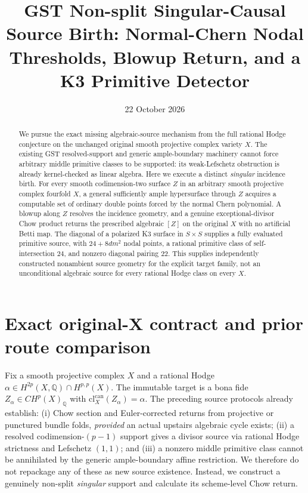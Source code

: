 \documentclass[11pt]{article}
\title{GST Non-split Singular-Causal Source Birth:
Normal-Chern Nodal Thresholds, Blowup Return, and a K3 Primitive Detector}
\date{22 October 2026}
\begin{document}
\maketitle
\begin{abstract}
We pursue the exact missing algebraic-source mechanism from the full
rational Hodge conjecture on the unchanged original smooth projective
complex variety $X$. The existing GST resolved-support and generic
ample-boundary machinery cannot force arbitrary middle primitive classes
to be supported: its weak-Lefschetz obstruction is already kernel-checked
as linear algebra. Here we execute a distinct \emph{singular} incidence
birth. For every smooth codimension-two surface $Z$ in an arbitrary
smooth projective complex fourfold $X$, a general sufficiently ample
hypersurface through $Z$ acquires a computable set of ordinary double
points forced by the normal Chern polynomial. A blowup along $Z$
resolves the incidence geometry, and a genuine exceptional-divisor
Chow product returns the prescribed algebraic $[Z]$ on the original
$X$ with no artificial Betti map. The diagonal of a polarized K3
surface in $S\times S$ supplies a fully evaluated primitive source,
with $24+8dm^2$ nodal points, a rational primitive class of
self-intersection $24$, and nonzero diagonal pairing $22$.
This supplies independently constructed nonambient source geometry
for the explicit target family, not an unconditional algebraic source
for every rational Hodge class on every $X$.
\end{abstract}

\section{Exact original-X contract and prior route comparison}
Fix a smooth projective complex $X$ and a rational Hodge
$\alpha\in H^{2p}(X,\mathbb Q)\cap H^{p,p}(X)$.
The immutable target is a bona fide
$Z_\alpha\in CH^p(X)_{\mathbb Q}$ with
$\mathrm{cl}^{\mathrm{can}}_X(Z_\alpha)=\alpha$.
The preceding source protocols already establish:
(i) Chow section and Euler-corrected returns from projective or punctured
bundle folds, \emph{provided} an actual upstairs algebraic cycle exists;
(ii) a resolved codimension-$(p-1)$ support gives a divisor source
via rational Hodge strictness and Lefschetz $(1,1)$; and
(iii) a nonzero middle primitive class cannot be annihilated by
the generic ample-boundary affine restriction.
We therefore do not repackage any of these as new source existence.
Instead, we construct a genuinely non-split \emph{singular}
support and calculate its scheme-level Chow return.
\end{document}

